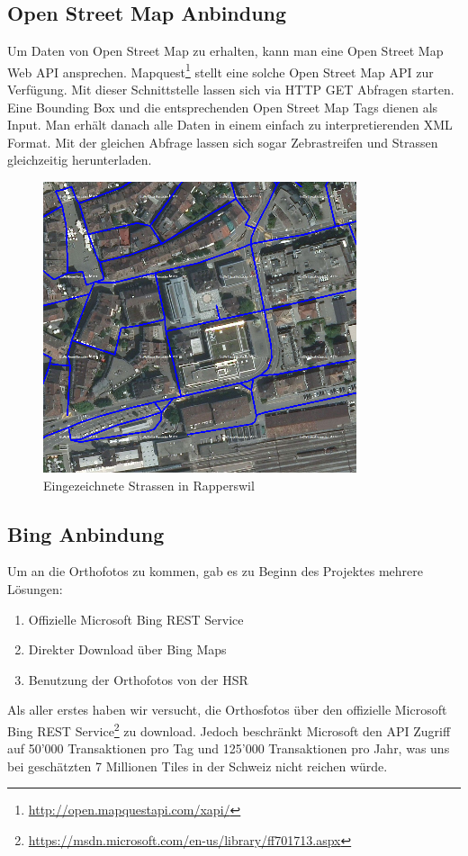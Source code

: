\subsection{Open Street Map Anbindung}
Um Daten von Open Street Map zu erhalten, kann man eine Open Street Map Web API ansprechen. Mapquest\footnote{\url{http://open.mapquestapi.com/xapi/}} stellt eine solche Open Street Map API zur Verfügung. Mit dieser Schnittstelle lassen sich via HTTP GET Abfragen starten. Eine Bounding Box und die entsprechenden Open Street Map Tags dienen als Input. Man erhält danach alle Daten in einem einfach zu interpretierenden XML Format. Mit der gleichen Abfrage lassen sich sogar Zebrastreifen und Strassen gleichzeitig herunterladen.

\begin{figure}[H]
	\centering
	\includegraphics{images/Strassen_Rapperswil.png}
	\caption{Eingezeichnete Strassen in Rapperswil}
\end{figure}

\newpage
\subsection{Bing Anbindung}
Um an die Orthofotos zu kommen, gab es zu Beginn des Projektes mehrere Lösungen:
\begin{enumerate}
	\item Offizielle Microsoft Bing REST Service
	\item Direkter Download über Bing Maps
	\item Benutzung der Orthofotos von der HSR
\end{enumerate}

Als aller erstes haben wir versucht, die Orthosfotos über den offizielle Microsoft Bing REST Service\footnote{\url{https://msdn.microsoft.com/en-us/library/ff701713.aspx}} zu download. Jedoch beschränkt Microsoft den API Zugriff auf 50'000 Transaktionen pro Tag und 125'000 Transaktionen pro Jahr, was uns bei geschätzten 7 Millionen Tiles in der Schweiz nicht reichen würde.

